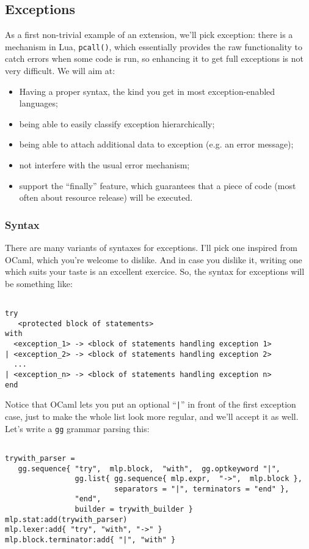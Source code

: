 \subsection{Exceptions}
As a first non-trivial example of an extension, we'll pick exception:
there is a mechanism in Lua, {\tt pcall()}, which essentially provides
the raw functionality to catch errors when some code is run, so
enhancing it to get full exceptions is not very difficult. We will aim
at:
\begin{itemize}
\item Having a proper syntax, the kind you get in most
  exception-enabled languages;
\item being able to easily classify exception hierarchically;
\item being able to attach additional data to exception (e.g. an error
  message);
\item not interfere with the usual error mechanism;
\item support the ``finally'' feature, which guarantees that a piece
  of code (most often about resource release) will be executed.
\end{itemize}

\subsubsection{Syntax}
There are many variants of syntaxes for exceptions. I'll pick one
inspired from OCaml, which you're welcome to dislike. And in case you
dislike it, writing one which suits your taste is an excellent
exercice. So, the syntax for exceptions will be something like:
\begin{Verbatim}[fontsize=\scriptsize]

try
   <protected block of statements>
with
  <exception_1> -> <block of statements handling exception 1>
| <exception_2> -> <block of statements handling exception 2>
  ...
| <exception_n> -> <block of statements handling exception n>
end
\end{Verbatim}

Notice that OCaml lets you put an optional ``{\tt|}'' in front of the
first exception case, just to make the whole list look more regular,
and we'll accept it as well. Let's write a {\tt gg} grammar parsing
this:

\begin{Verbatim}[fontsize=\scriptsize]

trywith_parser = 
   gg.sequence{ "try",  mlp.block,  "with",  gg.optkeyword "|",
                gg.list{ gg.sequence{ mlp.expr,  "->",  mlp.block },
                         separators = "|", terminators = "end" },
                "end", 
                builder = trywith_builder }
mlp.stat:add(trywith_parser)
mlp.lexer:add{ "try", "with", "->" }
mlp.block.terminator:add{ "|", "with" }
\end{Verbatim}

